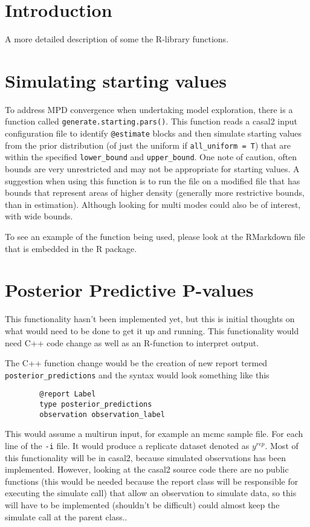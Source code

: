 \documentclass[12pt,preprint,authoryear]{article}
\begin{document}
\section{Introduction}
A more detailed description of some the R-library functions.


\section{Simulating starting values}
To address MPD convergence when undertaking model exploration, there is a function called \texttt{generate.starting.pars()}. This function reads a casal2 input configuration file to identify \texttt{@estimate} blocks and then simulate starting values from the prior distribution (of just the uniform if \texttt{all\_uniform = T}) that are within the specified \texttt{lower\_bound} and \texttt{upper\_bound}. One note of caution, often bounds are very unrestricted and may not be appropriate for starting values. A suggestion when using this function is to run the file on a modified file that has bounds that represent areas of higher density (generally more restrictive bounds, than in estimation). Although looking for multi modes could also be of interest, with wide bounds.


To see an example of the function being used, please look at the RMarkdown file that is embedded in the R package.

\section{Posterior Predictive P-values}
This functionality hasn't been implemented yet, but this is initial thoughts on what would need to be done to get it up and running. This functionality would need C++ code change as well as an R-function to interpret output.

The C++ function change would be the creation of new report termed \texttt{posterior\_predictions} and the syntax would look something like this

{\small{\begin{verbatim}
		@report Label
		type posterior_predictions
		observation observation_label
		\end{verbatim}
	}
}

This would assume a multirun input, for example an mcmc sample file. For each line of the \texttt{-i} file. It would produce a replicate dataset denoted as \(y^{rep}\). Most of this functionality will be in casal2, because simulated observations has been implemented. However, looking at the casal2 source code there are no public functions (this would be needed because the report class will be responsible for executing the simulate call) that allow an observation to simulate data, so this will have to be implemented (shouldn't be difficult) could almost keep the simulate call at the parent class..
\end{document}
